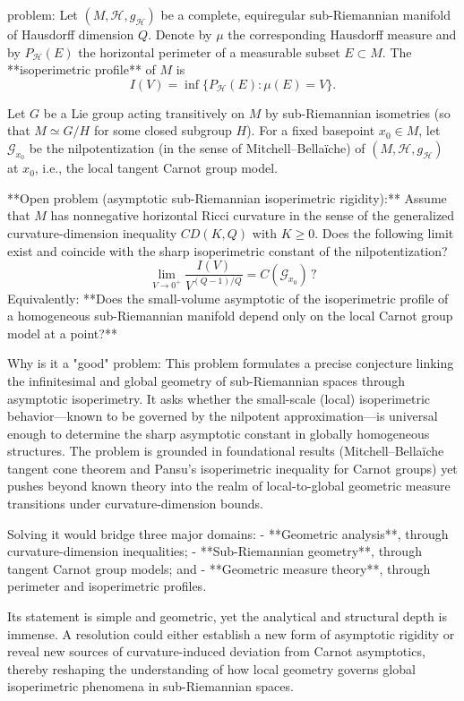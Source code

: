 problem:  
Let \((M, \mathcal{H}, g_{\mathcal{H}})\) be a complete, equiregular sub-Riemannian manifold of Hausdorff dimension \(Q\). Denote by \(\mu\) the corresponding Hausdorff measure and by \(P_{\mathcal{H}}(E)\) the horizontal perimeter of a measurable subset \(E \subset M\). The **isoperimetric profile** of \(M\) is  
\[
I(V) = \inf\{ P_{\mathcal{H}}(E) : \mu(E) = V\}.
\]

Let \(G\) be a Lie group acting transitively on \(M\) by sub-Riemannian isometries (so that \(M \simeq G/H\) for some closed subgroup \(H\)). For a fixed basepoint \(x_0 \in M\), let \(\mathcal{G}_{x_0}\) be the nilpotentization (in the sense of Mitchell–Bellaïche) of \((M, \mathcal{H}, g_{\mathcal{H}})\) at \(x_0\), i.e., the local tangent Carnot group model.  

**Open problem (asymptotic sub-Riemannian isoperimetric rigidity):**  
Assume that \(M\) has nonnegative horizontal Ricci curvature in the sense of the generalized curvature-dimension inequality \(CD(K, Q)\) with \(K \ge 0\). Does the following limit exist and coincide with the sharp isoperimetric constant of the nilpotentization?
\[
\lim_{V \to 0^+} \frac{I(V)}{V^{(Q-1)/Q}} = C(\mathcal{G}_{x_0}) \,?
\]
Equivalently: **Does the small-volume asymptotic of the isoperimetric profile of a homogeneous sub-Riemannian manifold depend only on the local Carnot group model at a point?**  

Why is it a "good" problem:  
This problem formulates a precise conjecture linking the infinitesimal and global geometry of sub-Riemannian spaces through asymptotic isoperimetry. It asks whether the small-scale (local) isoperimetric behavior—known to be governed by the nilpotent approximation—is universal enough to determine the sharp asymptotic constant in globally homogeneous structures. The problem is grounded in foundational results (Mitchell–Bellaïche tangent cone theorem and Pansu’s isoperimetric inequality for Carnot groups) yet pushes beyond known theory into the realm of local-to-global geometric measure transitions under curvature-dimension bounds.  

Solving it would bridge three major domains:  
- **Geometric analysis**, through curvature-dimension inequalities;  
- **Sub-Riemannian geometry**, through tangent Carnot group models; and  
- **Geometric measure theory**, through perimeter and isoperimetric profiles.  

Its statement is simple and geometric, yet the analytical and structural depth is immense. A resolution could either establish a new form of asymptotic rigidity or reveal new sources of curvature-induced deviation from Carnot asymptotics, thereby reshaping the understanding of how local geometry governs global isoperimetric phenomena in sub-Riemannian spaces.